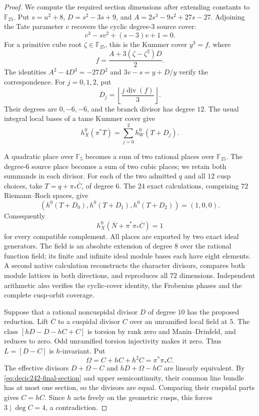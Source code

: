 \begin{proof}
We compute the required section dimensions after extending
constants to $\mathbb F_{25}$.
Put $s=u^2+8$, $D=s^2-3s+9$, and
$A=2s^3-9s^2+27s-27$.
Adjoining the Tate parameter $v$ recovers the cyclic degree-$3$
source cover:
\[
 v^3-sv^2+(s-3)v+1=0.
\]
For a primitive cube root $\zeta\in\mathbb F_{25}$, this is the
Kummer cover $y^3=f$, where
\[
 f=\frac{A+3(\zeta-\zeta^2)D}{2}.
\]
The identities
$A^2-4D^3=-27D^2$ and $3v-s=y+D/y$ verify the correspondence.
For $j=0,1,2$, put
\[
 D_j=\left\lfloor\frac{j\operatorname{div}(f)}3\right\rfloor.
\]
Their degrees are $0,-6,-6$, and the branch divisor has degree
$12$. The usual integral local bases of a tame Kummer cover give
\[
 h^0_X(\pi^*T)=\sum_{j=0}^2h^0_W(T+D_j).
\]

A quadratic place over $\mathbb F_5$ becomes a sum of two rational
places over $\mathbb F_{25}$.
The degree-$6$ source place becomes a sum of two cubic places;
we retain both summands in each divisor.
For each of the two admitted $q$ and all $12$ cusp choices, take
$T=q+\pi_*\overline C$, of degree $6$.
The $24$ exact calculations, comprising $72$ Riemann--Roch spaces,
give
\[
 (h^0(T+D_0),h^0(T+D_1),h^0(T+D_2))=(1,0,0).
\]
Consequently
\begin{equation}\label{eq:decic242-final-section}
 h^0_X(\overline N+\pi^*\pi_*\overline C)=1
\end{equation}
for every compatible complement.
All places are exported by two exact ideal generators.
The field is an absolute extension of degree $8$ over the rational
function field; its finite and infinite ideal module bases each
have eight elements. A second native calculation reconstructs
the character divisors, compares both module lattices in both
directions, and reproduces all $72$ dimensions.
Independent arithmetic also verifies the cyclic-cover identity,
the Frobenius phases and the complete cusp-orbit coverage.

Suppose that a rational noncuspidal divisor $D$ of degree $10$
has the proposed reduction.
Lift $\overline C$ to a cuspidal divisor $C$ over an unramified
local field at $5$.
The class $[hD-D-hC+C]$ is torsion by rank zero and
Manin--Drinfeld, and reduces to zero.
Odd unramified torsion injectivity makes it zero.
Thus $L=[D-C]$ is $h$-invariant.
Put
\[
 \Omega=C+hC+h^2C=\pi^*\pi_*C.
\]
The effective divisors $D+\Omega-C$ and $hD+\Omega-hC$ are
linearly equivalent.
By \eqref{eq:decic242-final-section} and upper semicontinuity,
their common line bundle has at most one section, so the divisors
are equal. Comparing their cuspidal parts gives $C=hC$.
Since $h$ acts freely on the geometric cusps, this forces
$3\mid\deg C=4$, a contradiction.
\end{proof}
